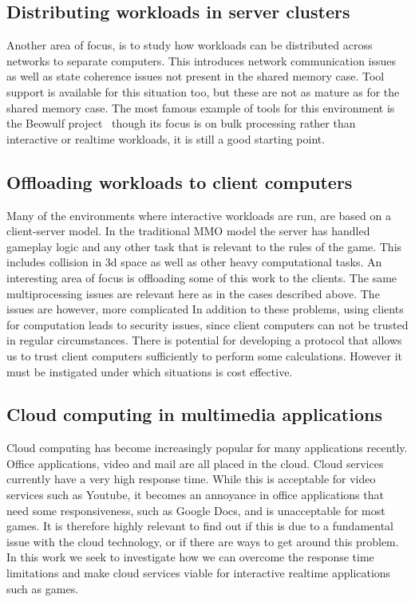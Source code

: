 \documentclass{article}
\begin{document}
\subsection {Distributing workloads in server clusters}
Another area of focus, is to study how
workloads can be distributed across networks to separate
computers. This introduces network communication issues as well as
state coherence issues not present in the shared memory case. Tool
support is available for this situation too, but these are not as mature as for
the shared memory case. The most famous example of tools for this
environment is the Beowulf project~\cite{beowulf} though its focus is on bulk processing rather
than interactive or realtime workloads, it is still a good starting point.


\subsection {Offloading workloads to client computers }
\label{sec:offloadtoclients}
Many of the environments where interactive workloads are run, are
based on a client-server model. In the traditional MMO model the server has handled gameplay logic
 and any other task that is relevant to the rules of the game. This includes collision in 3d space
 as well as other heavy computational tasks. An  interesting area of focus is offloading some of
 this work to the clients. The same multiprocessing issues are
relevant here as in the cases described above. The issues are however, more complicated In addition
to these problems, using clients for computation leads to security
issues, since client computers can not be trusted in regular
circumstances. There is potential for developing a protocol that
allows us to trust client computers sufficiently to perform some
calculations. However it must be instigated under which situations is cost effective.

\subsection {Cloud computing in multimedia applications }
Cloud computing has become increasingly popular for many applications
recently. Office applications, video and mail are all placed in the
cloud. Cloud services currently have a very high response time.
While this is acceptable for video services such as Youtube,
it becomes an annoyance in office applications that need some responsiveness, such as Google Docs, and is unacceptable for most games. It is therefore highly relevant to find out if this is due to a fundamental issue with the cloud technology, or if there are ways to get around this problem.
In this work we seek to investigate how we can overcome the response time limitations and make cloud services
viable for interactive realtime applications such as games.
\end{document}
